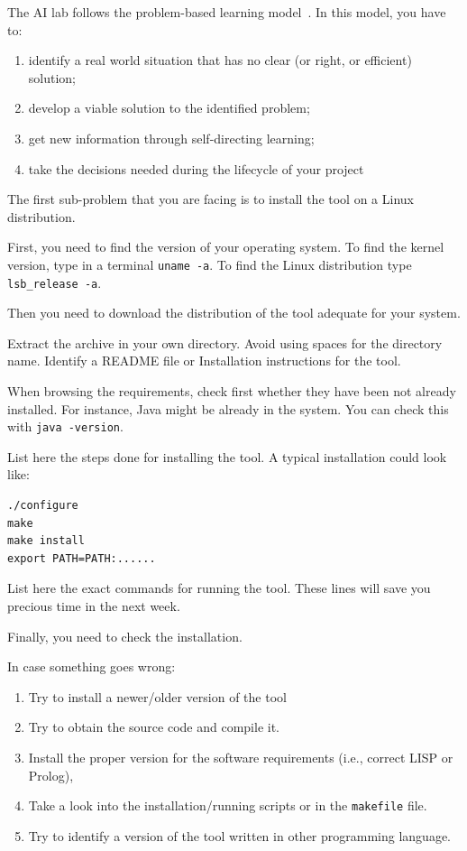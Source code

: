 \documentclass[a4paper,12pt]{report}
\begin{document}
The AI lab follows the problem-based learning model~\cite{hmelo2004problem}. 
In this model, you have to:
\begin{enumerate}
 \item identify a real world situation that has no clear (or right, or efficient) 
solution;
\item  develop a viable solution to the identified problem;
\item  get new information through self-directing learning;
\item  take the decisions needed during the lifecycle of your project 

\end{enumerate}


The first sub-problem that you are facing is to install 
the tool on a Linux distribution.

First, you need to find the version of your operating system.
To find the kernel version, type in a terminal \texttt{uname -a}.
To find the Linux distribution type \texttt{lsb\_release -a}.

Then you need to download the distribution of the tool adequate for your system.

Extract the archive in your own directory. 
Avoid using spaces for the directory name. 
Identify a README file or Installation instructions for the tool.

When browsing the requirements, check first whether they have been not 
already installed.
For instance, Java might be already in the system. 
You can check this with \texttt{java -version}.

List here the steps done for installing the tool. 
A typical installation could look like:

\begin{verbatim}
./configure
make
make install
export PATH=PATH:......
\end{verbatim}

List here the exact commands for running the tool. 
These lines will save you precious time in the next week.

Finally, you need to check the installation.


In case something goes wrong:

\begin{enumerate}
 \item Try to install a newer/older version of the tool
\item Try to obtain the source code and compile it.
\item Install the proper version for the software requirements (i.e., correct LISP or Prolog),
\item Take a look into the installation/running scripts or in the \texttt{makefile} file.
\item Try to identify a version of the tool written in other programming language.
\end{enumerate}
\end{document}

